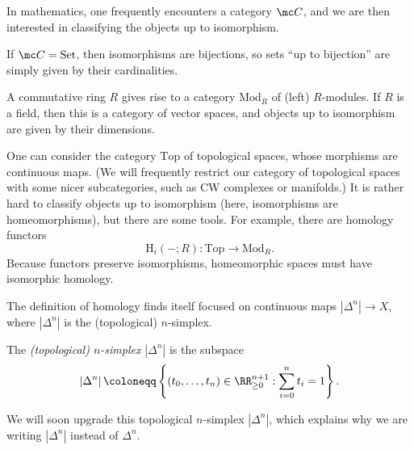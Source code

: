 \documentclass[../notes.tex]{subfiles}
\begin{document}
In mathematics, one frequently encounters a category $\mc C$, and we are then interested in classifying the objects up to isomorphism.
\begin{example}
	If $\mc C=\mathrm{Set}$, then isomorphisms are bijections, so sets ``up to bijection'' are simply given by their cardinalities.
\end{example}
\begin{example}
	A commutative ring $R$ gives rise to a category $\mathrm{Mod}_R$ of (left) $R$-modules. If $R$ is a field, then this is a category of vector spaces, and objects up to isomorphism are given by their dimensions.
\end{example}
\begin{example}
	One can consider the category $\mathrm{Top}$ of topological spaces, whose morphisms are continuous maps. (We will frequently restrict our category of topological spaces with some nicer subcategories, such as CW complexes or manifolds.) It is rather hard to classify objects up to isomorphism (here, isomorphisms are homeomorphisms), but there are some tools. For example, there are homology functors
	\[\mathrm H_i(-;R)\colon\mathrm{Top}\to\mathrm{Mod}_R.\]
	Because functors preserve isomorphisms, homeomorphic spaces must have isomorphic homology.
\end{example}
The definition of homology finds itself focused on continuous maps $\left|\Delta^n\right|\to X$, where $\left|\Delta^n\right|$ is the (topological) $n$-simplex.
\begin{defihelper}[$n$-simplex] 
	The \textit{(topological) $n$-simplex} $\left|\Delta^n\right|$ is the subspace
	\[\left|\Delta^n\right|\coloneqq\left\{(t_0,\ldots,t_n)\in\RR_{\ge0}^{n+1}:\sum_{i=0}^nt_i=1\right\}.\]
\end{defihelper}
We will soon upgrade this topological $n$-simplex $\left|\Delta^n\right|$, which explains why we are writing $\left|\Delta^n\right|$ instead of $\Delta^n$.
\end{document}
